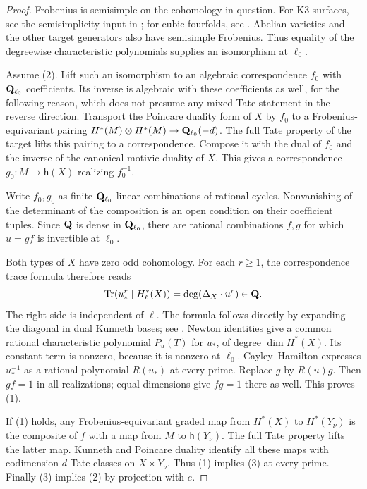 \begin{proof}
Frobenius is semisimple on the cohomology in question. For K3
surfaces, see the semisimplicity input in
\citet[Lemma 10.4 and Remark 10.5, p.~54]{IIK2021}; for cubic
fourfolds, see \citet[introduction, author preprint p.~1]{Zarhin2004}.
Abelian varieties and the other target generators also have
semisimple Frobenius. Thus equality of the degreewise characteristic
polynomials supplies an isomorphism at $\ell_0$.

Assume (2). Lift such an isomorphism to an algebraic correspondence
$f_0$ with $\mathbf Q_{\ell_0}$ coefficients. Its inverse is algebraic
with these coefficients as well, for the following reason, which
does not presume any mixed Tate statement in the reverse direction.
Transport the Poincare duality form of $X$ by $f_0$ to a
Frobenius-equivariant pairing
$H^*(M)\otimes H^*(M)\to\mathbf Q_{\ell_0}(-d)$.
The full Tate property of the target lifts this pairing to a
correspondence. Compose it with the dual of $f_0$ and the inverse
of the canonical motivic duality of $X$. This gives a correspondence
$g_0:M\to\mathsf h(X)$ realizing $f_0^{-1}$.

Write $f_0,g_0$ as finite $\mathbf Q_{\ell_0}$-linear combinations of
rational cycles. Nonvanishing of the determinant of the composition
is an open condition on their coefficient tuples. Since $\mathbf Q$ is
dense in $\mathbf Q_{\ell_0}$, there are rational combinations $f,g$ for
which $u=gf$ is invertible at $\ell_0$.

Both types of $X$ have zero odd cohomology. For each $r\ge1$,
the correspondence trace formula therefore reads
\begin{equation}\label{eq:trace-certificate}
 \operatorname{Tr}(u_*^r\mid H^*_\ell(X))
           =\deg(\Delta_X\cdot u^r)\in\mathbf Q.
\end{equation}
The right side is independent of $\ell$. The formula follows
directly by expanding the diagonal in dual Kunneth bases; see
\citet[Lemmas 45.9.7 and 45.10.3, Tags 0FHH and 0FHR]{Stacks}.
Newton identities give a common rational characteristic polynomial
$P_u(T)$ for $u_*$, of degree $\dim H^*(X)$. Its constant term
is nonzero, because it is nonzero at $\ell_0$. Cayley--Hamilton
expresses $u_*^{-1}$ as a rational polynomial $R(u_*)$ at every
prime. Replace $g$ by $R(u)g$. Then $gf=1$ in all realizations;
equal dimensions give $fg=1$ there as well. This proves (1).

If (1) holds, any Frobenius-equivariant graded map from $H^*(X)$
to $H^*(Y_\nu)$ is the composite of $f$ with a map from $M$ to
$\mathsf h(Y_\nu)$. The full Tate property lifts the latter map.
Kunneth and Poincare duality identify all these maps with
codimension-$d$ Tate classes on $X\times Y_\nu$. Thus (1) implies
(3) at every prime. Finally (3) implies (2) by projection with $e$.
\end{proof}

